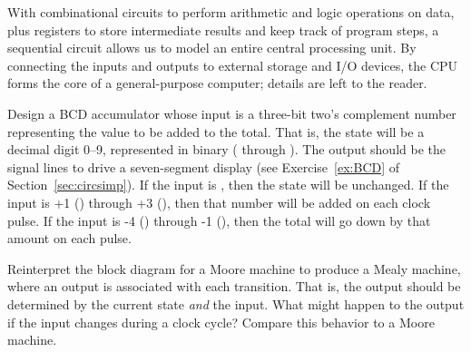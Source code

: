 \begin{tailquote}
With combinational circuits to perform arithmetic and logic operations on data, plus registers to store intermediate results and keep track of program steps, a sequential circuit allows us to model an entire central processing unit. By connecting the inputs and outputs to external storage and I/O devices, the CPU forms the core of a general-purpose computer; details are left to the reader.
\end{tailquote}
\begin{exercises}
\item Design a BCD accumulator whose input is a three-bit two's complement number representing the value to be added to the total. That is, the state will be a decimal digit 0--9, represented in binary (\0\0\0\0 through \1\0\0\1). The output should be the signal lines to drive a seven-segment display (see Exercise~\ref{ex:BCD} of Section~\ref{sec:circsimp}). If the input is \0\0\0, then the state will be unchanged. If the input is +1 (\0\0\1) through +3 (\0\1\1), then that number will be added on each clock pulse. If the input is -4 (\1\0\0) through -1 (\1\1\1), then the total will go down by that amount on each pulse.

\item Reinterpret the block diagram for a Moore machine to produce a Mealy machine, where an output is associated with each transition. That is, the output should be determined by the current state \emph{and} the input. What might happen to the output if the input changes during a clock cycle? Compare this behavior to a Moore machine.
\end{exercises}


